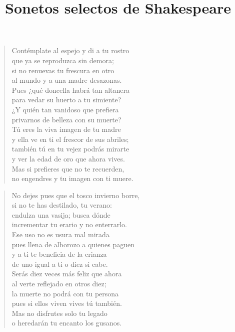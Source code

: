\documentclass[12pt]{article}
\date{}
\title{Sonetos selectos de Shakespeare}
\begin{document}
\maketitle
\tableofcontents
\clearpage
{}
\begin{verse}

Contémplate al espejo y di a tu rostro\\
que ya se reproduzca sin demora;\\
si no renuevas tu frescura en otro\\
al mundo y a una madre desazonas.\\
Pues ¿qué doncella habrá tan altanera\\
para vedar su huerto a tu simiente?\\
¿Y quién tan vanidoso que prefiera\\
privarnos de belleza con su muerte?\\
Tú eres la viva imagen de tu madre\\
y ella ve en ti el frescor de sus abriles;\\
también tú en tu vejez podrás mirarte\\
y ver la edad de oro que ahora vives.\\
Mas si prefieres que no te recuerden,\\
no engendres y tu imagen con ti muere.

\end{verse}

\clearpage
{}
\begin{verse}

No dejes pues que el tosco invierno borre,\\
si no te has destilado, tu verano:\\
endulza una vasija; busca dónde\\
incrementar tu erario y no enterrarlo.\\
Ese uso no es usura mal mirada\\
pues llena de alborozo a quienes paguen\\
y a ti te beneficia de la crianza\\
de uno igual a ti o diez si cabe.\\
Serás diez veces más feliz que ahora\\
al verte reflejado en otros diez;\\
la muerte no podrá con tu persona\\
pues si ellos viven vives tú también.\\
Mas no disfrutes solo tu legado\\
o heredarán tu encanto los gusanos. 

\end{verse}
\end{document}
